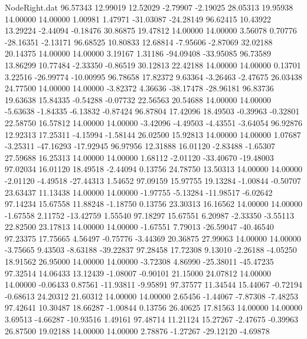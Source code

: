 \begin{filecontents}{NodeRight.dat}
  96.57343   12.99019   12.52029    -2.79907   -2.19025   28.05313   19.95938   14.00000   14.00000    1.00981    1.47971  -31.03087  -24.28149
  96.62415   10.43922   13.29224    -2.44094   -0.18476   30.86875   19.47812   14.00000   14.00000    3.56078    0.70776  -28.16351   -2.13171
  96.68525   10.80833   12.68814    -7.95606   -2.87069   32.02188   20.14375   14.00000   14.00000    3.19167    1.31186  -94.09408  -33.95085
  96.73589   13.86299   10.77484    -2.33350   -0.86519   30.12813   22.42188   14.00000   14.00000    0.13701    3.22516  -26.99774  -10.00995
  96.78658   17.82372    9.63364    -3.26463   -2.47675   26.03438   24.77500   14.00000   14.00000   -3.82372    4.36636  -38.17478  -28.96181
  96.83736   19.63638   15.84335    -0.54288   -0.07732   22.56563   20.54688   14.00000   14.00000   -5.63638   -1.84335   -6.13832   -0.87424
  96.87804   17.42096   18.49503    -0.39963   -0.32801   22.58750   16.57812   14.00000   14.00000   -3.42096   -4.49503   -4.43551   -3.64054
  96.92876   12.92313   17.25311    -4.15994   -1.58144   26.02500   15.92813   14.00000   14.00000    1.07687   -3.25311  -47.16293  -17.92945
  96.97956   12.31888   16.01120    -2.83488   -1.65307   27.59688   16.25313   14.00000   14.00000    1.68112   -2.01120  -33.40670  -19.48003
  97.02034   16.01120   18.49518    -2.44094    0.13756   24.78750   13.50313   14.00000   14.00000   -2.01120   -4.49518  -27.44313    1.54652
  97.09159   15.97755   19.13284    -1.00844   -0.50707   23.63437   11.13438   14.00000   14.00000   -1.97755   -5.13284  -11.98517   -6.02642
  97.14234   15.67558   11.88248    -1.18750    0.13756   23.30313   16.16562   14.00000   14.00000   -1.67558    2.11752  -13.42759    1.55540
  97.18297   15.67551    6.20987    -2.33350   -3.55113   22.82500   23.17813   14.00000   14.00000   -1.67551    7.79013  -26.59047  -40.46540
  97.23375   17.75665    4.56497    -0.75776   -3.44369   20.36875   27.99063   14.00000   14.00000   -3.75665    9.43503   -8.63188  -39.22837
  97.28458   17.72308    9.13010    -2.26188   -4.05250   18.91562   26.95000   14.00000   14.00000   -3.72308    4.86990  -25.38011  -45.47235
  97.32514   14.06433   13.12439    -1.08007   -0.90101   21.15000   24.07812   14.00000   14.00000   -0.06433    0.87561  -11.93811   -9.95891
  97.37577   11.34544   15.44067    -0.72194   -0.68613   24.20312   21.60312   14.00000   14.00000    2.65456   -1.44067   -7.87308   -7.48253
  97.42641   10.30487   18.66287    -1.00844    0.13756   26.40625   17.81563   14.00000   14.00000    3.69513   -4.66287  -10.93516    1.49161
  97.48714   11.21124   15.27267    -2.47675   -0.39963   26.87500   19.02188   14.00000   14.00000    2.78876   -1.27267  -29.12120   -4.69878

\end{filecontents}
